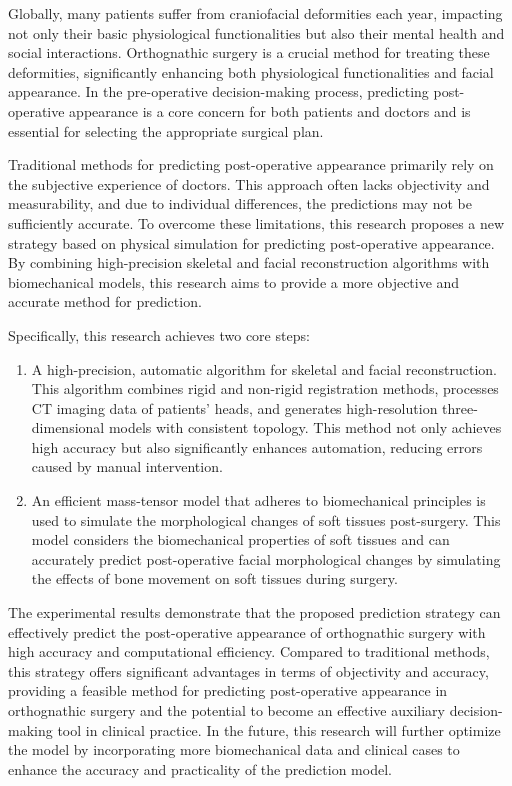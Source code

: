 \begin{abstract*}
  Globally, many patients suffer from craniofacial deformities each year, impacting not only their basic physiological functionalities but also their mental health and social interactions.
  Orthognathic surgery is a crucial method for treating these deformities, significantly enhancing both physiological functionalities and facial appearance.
  In the pre-operative decision-making process, predicting post-operative appearance is a core concern for both patients and doctors and is essential for selecting the appropriate surgical plan.

  Traditional methods for predicting post-operative appearance primarily rely on the subjective experience of doctors.
  This approach often lacks objectivity and measurability, and due to individual differences, the predictions may not be sufficiently accurate.
  To overcome these limitations, this research proposes a new strategy based on physical simulation for predicting post-operative appearance.
  By combining high-precision skeletal and facial reconstruction algorithms with biomechanical models, this research aims to provide a more objective and accurate method for prediction.

  Specifically, this research achieves two core steps:
  \begin{enumerate}
    \item A high-precision, automatic algorithm for skeletal and facial reconstruction.
          This algorithm combines rigid and non-rigid registration methods, processes CT imaging data of patients' heads, and generates high-resolution three-dimensional models with consistent topology.
          This method not only achieves high accuracy but also significantly enhances automation, reducing errors caused by manual intervention.
    \item An efficient mass-tensor model that adheres to biomechanical principles is used to simulate the morphological changes of soft tissues post-surgery.
          This model considers the biomechanical properties of soft tissues and can accurately predict post-operative facial morphological changes by simulating the effects of bone movement on soft tissues during surgery.
  \end{enumerate}

  The experimental results demonstrate that the proposed prediction strategy can effectively predict the post-operative appearance of orthognathic surgery with high accuracy and computational efficiency.
  Compared to traditional methods, this strategy offers significant advantages in terms of objectivity and accuracy, providing a feasible method for predicting post-operative appearance in orthognathic surgery and the potential to become an effective auxiliary decision-making tool in clinical practice.
  In the future, this research will further optimize the model by incorporating more biomechanical data and clinical cases to enhance the accuracy and practicality of the prediction model.

\end{abstract*}
